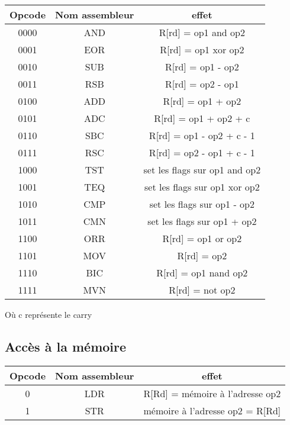 \documentclass[a4paper]{article}
\begin{document}
\begin{tabular}{|c|c|c|}
  \hline
  Opcode & Nom assembleur & effet \\
  \hline
  0000 & AND & R[rd] = op1 and op2\\
  0001 & EOR & R[rd] = op1 xor op2\\
  0010 & SUB & R[rd] = op1 - op2\\
  0011 & RSB & R[rd] = op2 - op1\\
  0100 & ADD & R[rd] = op1 + op2\\
  0101 & ADC & R[rd] = op1 + op2 + c\\
  0110 & SBC & R[rd] = op1 - op2 + c - 1\\
  0111 & RSC & R[rd] = op2 - op1 + c - 1\\
  1000 & TST & set les flags sur op1 and op2\\
  1001 & TEQ & set les flags sur op1 xor op2\\
  1010 & CMP & set les flags sur op1 - op2\\
  1011 & CMN & set les flags sur op1 + op2\\
  1100 & ORR & R[rd] = op1 or op2\\
  1101 & MOV & R[rd] = op2\\
  1110 & BIC & R[rd] = op1 nand op2\\
  1111 & MVN & R[rd] = not op2\\
  \hline
\end{tabular}

Où c représente le carry

\subsection{Accès à la mémoire}

\begin{tabular}{|c|c|c|}
  \hline
  Opcode & Nom assembleur & effet\\
  \hline
  0 & LDR & R[Rd] = mémoire à l'adresse op2\\
  1 & STR & mémoire à l'adresse op2 = R[Rd]\\
  \hline

\end{tabular}
\end{document}
